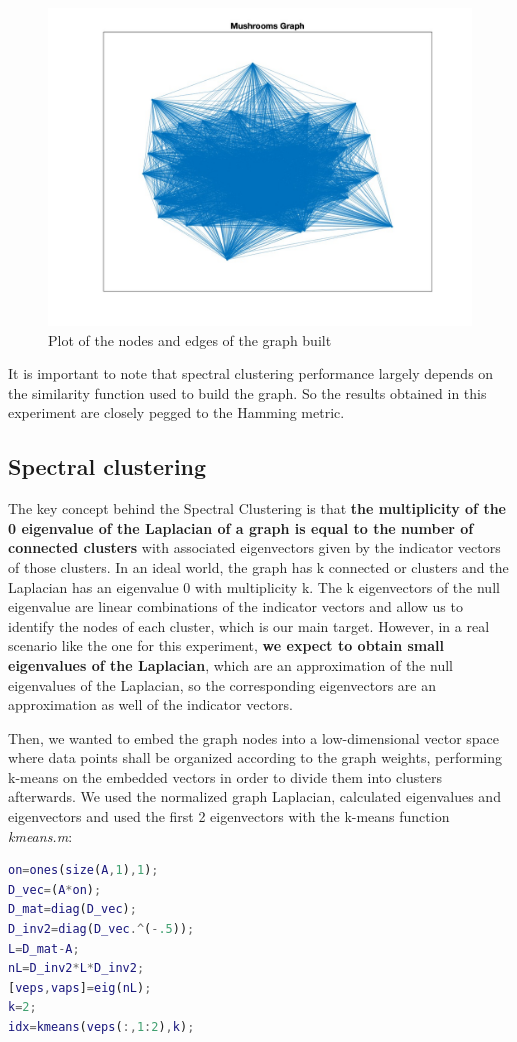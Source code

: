 \documentclass[12pt]{article}
\begin{document}
\begin{figure}[H]
	\centering
	\includegraphics[width=13cm]{1.jpg}
	\caption{Plot of the nodes and edges of the graph built}
	\label{fig:graphRepresentation}
\end{figure}

It is important to note that spectral clustering performance largely depends on the similarity function used to build the graph. So the results obtained in this experiment are closely pegged to the Hamming metric.

\subsection{Spectral clustering}
\justifying
The key concept behind the Spectral Clustering is that \textbf{the multiplicity of the 0 eigenvalue of the Laplacian of a graph is equal to the number of connected clusters} with associated eigenvectors given by the indicator vectors of those clusters. In an ideal world, the graph has k connected or clusters and the Laplacian has an eigenvalue 0 with multiplicity k. The k eigenvectors of the null eigenvalue are linear combinations of the indicator vectors and allow us to identify the nodes of each cluster, which is our main target. However, in a real scenario like the one for this experiment, \textbf{we expect to obtain small eigenvalues of the Laplacian}, which are an approximation of the null eigenvalues of the Laplacian, so the corresponding eigenvectors are an approximation as well of the indicator vectors.

Then, we wanted to embed the graph nodes into a low-dimensional vector space where data points shall be organized according to the graph weights, performing k-means on the embedded vectors in order to divide them into clusters afterwards. We used the normalized graph Laplacian, calculated eigenvalues and eigenvectors and used the first 2 eigenvectors with the k-means function \emph{kmeans.m}:
\smallskip
\begin{lstlisting}[language=matlab]
on=ones(size(A,1),1);
D_vec=(A*on);
D_mat=diag(D_vec);
D_inv2=diag(D_vec.^(-.5));
L=D_mat-A;
nL=D_inv2*L*D_inv2;
[veps,vaps]=eig(nL);
k=2;
idx=kmeans(veps(:,1:2),k);
\end{lstlisting}
\end{document}
